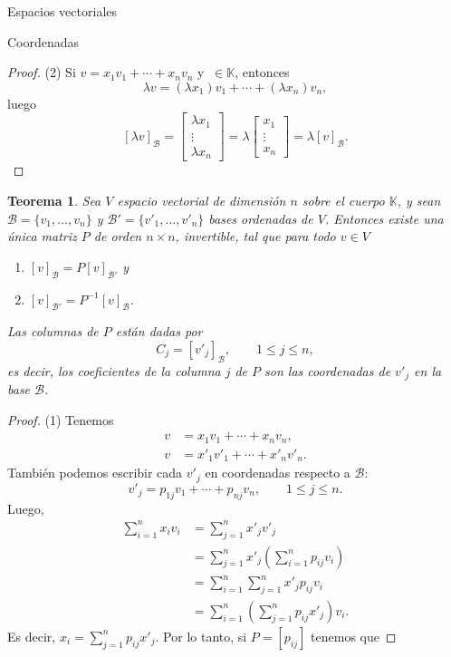 \documentclass[a4paper,12pt,twoside,spanish,reqno]{amsbook}
\newtheorem{teorema}{Teorema}[section]
\theoremstyle{definition}
\theoremstyle{remark}
\newcommand{\K}{\mathbb K}
\begin{document}
\begin{chapter}{Espacios vectoriales}
\begin{section}{Coordenadas}
\begin{proof}
		(2) Si $v = x_1v_1 + \cdots +x_nv_n$ y $\ \in \K$, entonces 
		$$
		\lambda v = (\lambda x_1)v_1 + \cdots +(\lambda x_n)v_n,
		$$
		luego
		$$
		[\lambda v ]_\mathcal{B} = \begin{bmatrix}\lambda x_1 \\ \vdots \\ \lambda x_n\end{bmatrix}
		= \lambda \begin{bmatrix}x_1 \\ \vdots \\ x_n\end{bmatrix} = \lambda [v]_\mathcal{B}.
		$$
	\end{proof}
	
	\begin{teorema}
			Sea $V$  espacio vectorial de dimensión $n$  sobre el cuerpo $\K$, 	y sean $	\mathcal{B} = \{v_1,\ldots,v_n\}$ y $\mathcal{B'} = \{v'_1,\ldots,v'_n\}$ bases ordenadas de $V$. Entonces existe una única matriz $P$ de orden $n \times n$, invertible, tal que para todo $v \in V$
			\begin{enumerate}
				\item $[v]_\mathcal{B} = P[v]_\mathcal{B'}$ y
				\item $[v]_\mathcal{B'} = P^{-1}[v]_\mathcal{B}$.
			\end{enumerate} 
			Las columnas de $P$ están dadas por
			$$
			C_j = [v'_j]_\mathcal{B},\qquad 1 \le j \le n,
			$$
			es decir, los coeficientes de la columna $j$ de $P$ son las coordenadas de $v'_j$ en la base $\mathcal{B}$. 
	\end{teorema}
	\begin{proof} (1) Tenemos
		\begin{align*}
			v &=   x_1v_1 + \cdots +x_nv_n, \\
			v &=  x'_1v'_1 + \cdots +x'_nv'_n.
		\end{align*}
		 También podemos escribir cada $v'_j$ en coordenadas respecto a $\mathcal B$:
		 $$
		 v'_j =  p_{1j}v_1 + \cdots +p_{nj}v_n, \qquad  1 \le j \le n.
		 $$ 
		Luego, 
		\begin{align*}
			 \sum_{i=1}^{n}x_iv_i &=  \sum_{j=1}^{n}x'_jv'_j \\
			&=  \sum_{j=1}^{n}x'_j(\sum_{i=1}^{n}p_{ij}v_i) \\
			&=  \sum_{i=1}^{n}\sum_{j=1}^{n}x'_jp_{ij}v_i \\
			&=  \sum_{i=1}^{n}(\sum_{j=1}^{n}p_{ij}x'_j)v_i.			
		\end{align*}
		Es decir, $x_i = \sum_{j=1}^{n}p_{ij}x'_j$. Por lo tanto, si $P = [p_{ij}]$ tenemos que

\end{proof}
\end{section}
\end{chapter}
\end{document}

